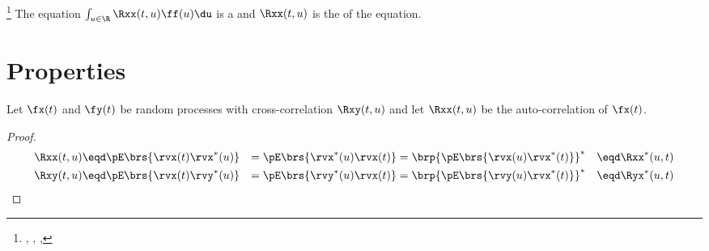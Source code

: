 \begin{remark}
\footnote{
  ,
  ,
  ,
  }
The equation $\int_{u\in\R}\Rxx(t,u)\ff(u) \du$ is a
    and
   $\Rxx(t,u)$ is the  of the equation.
\end{remark}

\section{Properties}

\begin{theorem}
\label{thm:Rxx_prop}
Let $\fx(t)$ and $\fy(t)$ be random processes with
cross-correlation $\Rxy(t,u)$ and
let $\Rxx(t,u)$ be the auto-correlation of $\fx(t)$.
\end{theorem}
\begin{proof}
\begin{align*}
   \Rxx(t,u)
      &\eqd \pE\brs{\rvx(t) \rvx^\ast(u)}
      &=    \pE\brs{\rvx^\ast(u) \rvx(t)}
      &=    \brp{ \pE\brs{\rvx(u) \rvx^\ast(t)}}^\ast
      &\eqd \Rxx^\ast(u,t)
\\
   \Rxy(t,u)
      &\eqd \pE\brs{\rvx(t) \rvy^\ast(u)}
      &=    \pE\brs{\rvy^\ast(u) \rvx(t) }
      &=    \brp{\pE\brs{\rvy(u) \rvx^\ast(t)}}^\ast
      &\eqd \Ryx^\ast(u,t)
\end{align*}
\end{proof}


